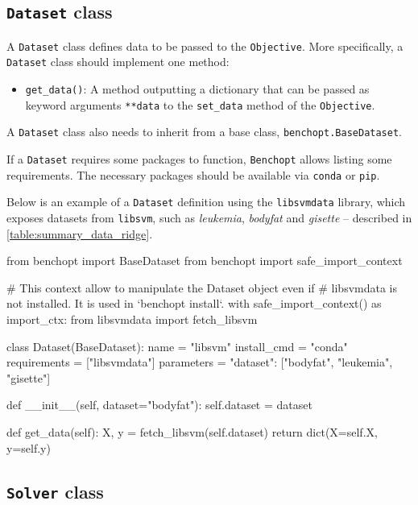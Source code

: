 \documentclass{article}
\newcommand{\Benchopt}{{{\texttt{Benchopt}}}}
\begin{document}
\subsection{\texttt{Dataset} class}

A \texttt{Dataset} class defines data to be passed to the \texttt{Objective}.
More specifically, a \texttt{Dataset} class should implement one method:
\begin{itemize}[topsep=0pt,itemsep=1ex,partopsep=0ex,parsep=0ex,leftmargin=3ex]
    \item \texttt{get\_data()}: A method outputting a dictionary that can be passed as keyword arguments \texttt{**data} to the \texttt{set\_data} method of the \texttt{Objective}.
\end{itemize}
A \texttt{Dataset} class also needs to inherit from a base class, \texttt{benchopt.BaseDataset}.

If a \texttt{Dataset} requires some packages to function, \Benchopt{} allows listing some requirements.
The necessary packages should be available via \texttt{conda} or \texttt{pip}.

Below is an example of a \texttt{Dataset} definition using the \texttt{libsvmdata} library, which exposes datasets from \texttt{libsvm}, such as \emph{leukemia}, \emph{bodyfat} and \emph{gisette} -- described in \autoref{table:summary_data_ridge}.

\begin{python}
from benchopt import BaseDataset
from benchopt import safe_import_context

# This context allow to manipulate the Dataset object even if
# libsvmdata is not installed. It is used in `benchopt install`.
with safe_import_context() as import_ctx:
    from libsvmdata import fetch_libsvm

class Dataset(BaseDataset):
    name = "libsvm"
    install_cmd = "conda"
    requirements = ["libsvmdata"]
    parameters = {"dataset": ["bodyfat", "leukemia", "gisette"]}

    def __init__(self, dataset="bodyfat"):
        self.dataset = dataset

    def get_data(self):
        X, y = fetch_libsvm(self.dataset)
        return dict(X=self.X, y=self.y)
\end{python}


\subsection{\texttt{Solver} class}
\end{document}
